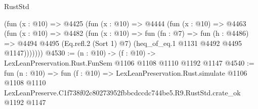 \begin{lexlean}{RustStd}
\begin{coremodule}
      (fun (x : @10) =>
      @4425
        (fun (x : @10) =>
        @4444
          (fun (x : @10) =>
          @4463
            (fun (x : @10) =>
            @4482
              (fun (x : @10) =>
              fun (fn : @7) =>
              fun (h : @4486) =>
              @4494 @4495 (Eq.refl.{2} (Sort 1) @7) (heq_of_eq.{1} @1131 @4492 @4495 @1147)))))))
@4530 := (n : @10) -> (f : @10) -> LexLeanPreservation.Rust.FunSem @1106 @1108 @1110 @1192 @1147
@4540 := fun (n : @10) =>
  fun (f : @10) =>
  LexLeanPreservation.Rust.simulate
    @1106
    @1108
    @1110
    LexLeanPreserve.C1f738f02c80273952fbbcdccdc744be5.R9.RustStd.crate_ok
    @1192
    @1147
\end{coremodule}
\end{lexlean}

